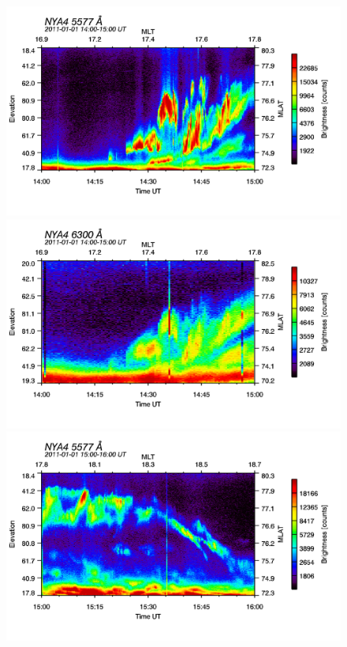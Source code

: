 \begin{figure}
\begin{minipage}{0.49\textwidth}
\includegraphics[width=1\linewidth]{Figures/Allsky/5577/nya4_20110101_1400_1500_5577_cal.png}
\end{minipage}
\begin{minipage}{0.49\textwidth}
\includegraphics[width=1\linewidth]{Figures/Allsky/6300/nya4_20110101_1400_1500_6300_cal.png}
\end{minipage}
\begin{minipage}{0.49\textwidth}
\includegraphics[width=1\linewidth]{Figures/Allsky/5577/nya4_20110101_1500_1600_5577_cal.png}

\end{minipage}
\end{figure}
